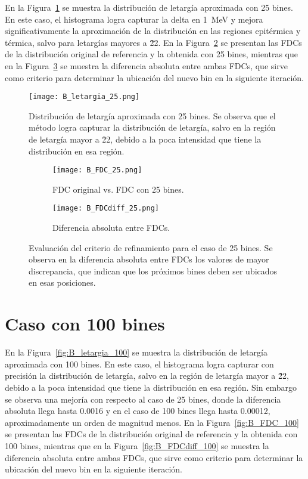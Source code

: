 En la Figura~\ref{fig:B_letargia_25} se muestra la distribución de letargía aproximada con 25 bines. En este caso, el histograma logra capturar la delta en 1~MeV y mejora significativamente la aproximación de la distribución en las regiones epitérmica y térmica, salvo para letargías mayores a \~ 22. En la Figura~\ref{fig:B_FDC_25} se presentan las FDCs de la distribución original de referencia y la obtenida con 25 bines, mientras que en la Figura~\ref{fig:B_FDCdiff_25} se muestra la diferencia absoluta entre ambas FDCs, que sirve como criterio para determinar la ubicación del nuevo bin en la siguiente iteración.

\begin{figure}[H]
    \centering
    \texttt{[image: B\_letargia\_25.png]}
    \caption{Distribución de letargía aproximada con 25 bines. Se observa que el método logra capturar la distribución de letargía, salvo en la región de letargía mayor a \~ 22, debido a la poca intensidad que tiene la distribución en esa región.}
    \label{fig:B_letargia_25}
\end{figure}

\begin{figure}[H]
    \centering
    \begin{subfigure}[b]{0.46\textwidth}
        \texttt{[image: B\_FDC\_25.png]}
        \caption{FDC original vs. FDC con 25 bines.}
        \label{fig:B_FDC_25}
    \end{subfigure}
    \hfill
    \begin{subfigure}[b]{0.46\textwidth}
        \texttt{[image: B\_FDCdiff\_25.png]}
        \caption{Diferencia absoluta entre FDCs.}
        \label{fig:B_FDCdiff_25}
    \end{subfigure}
    \caption{Evaluación del criterio de refinamiento para el caso de 25 bines. Se observa en la diferencia absoluta entre FDCs los valores de mayor discrepancia, que indican que los próximos bines deben ser ubicados en esas posiciones.}
    \label{fig:B_FDC_25_25}
\end{figure}

\section*{Caso con 100 bines}

En la Figura~\ref{fig:B_letargia_100} se muestra la distribución de letargía aproximada con 100 bines. En este caso, el histograma logra capturar con precisión la distribución de letargía, salvo en la región de letargía mayor a \~ 22, debido a la poca intensidad que tiene la distribución en esa región. Sin embargo se observa una mejoría con respecto al caso de 25 bines, donde la diferencia absoluta llega hasta 0.0016 y en el caso de 100 bines llega hasta 0.00012, aproximadamente un orden de magnitud menos. En la Figura~\ref{fig:B_FDC_100} se presentan las FDCs de la distribución original de referencia y la obtenida con 100 bines, mientras que en la Figura~\ref{fig:B_FDCdiff_100} se muestra la diferencia absoluta entre ambas FDCs, que sirve como criterio para determinar la ubicación del nuevo bin en la siguiente iteración.


